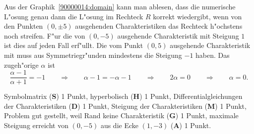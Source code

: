 \begin{loesung}
\begin{teilaufgaben}
\item
Aus der Graphik~\ref{90000014:domain} kann man ablesen,
dass die numerische L"osung genau dann
die L"osung im Rechteck $R$ korrekt wiedergibt, wenn von den Punkten
$(0,\pm 5)$ ausgehenden Charakteristiken das Rechteck h"ochstens noch 
streifen.
F"ur die von $(0,-5)$ ausgehende Charakteristik mit Steigung $1$ ist
dies auf jeden Fall erf"ullt.
Die vom Punkt $(0,5)$ ausgehende Charakteristik mit muss aus
Symmetriegr"unden mindestens die Steigung $-1$ haben.
Das zugeh"orige $\alpha$ ist
\[
\frac{\alpha - 1}{\alpha + 1}=-1
\qquad\Rightarrow\qquad
\alpha - 1 = -\alpha - 1
\qquad\Rightarrow\qquad
2\alpha=0
\qquad\Rightarrow\qquad
\alpha =0.
\]
\qedhere
\end{teilaufgaben}
\end{loesung}

\begin{bewertung}
Symbolmatrix ({\bf S}) 1 Punkt,
hyperbolisch ({\bf H}) 1 Punkt,
Differentialgleichungen der Charakteristiken ({\bf D}) 1 Punkt,
Steigung der Charakteristiken ({\bf M}) 1 Punkt,
Problem gut gestellt, weil Rand keine Charakteristik ({\bf G}) 1 Punkt,
maximale Steigung erreicht von $(0,-5)$ aus die Ecke $(1,-3)$ ({\bf A})
1 Punkt.
\end{bewertung}
